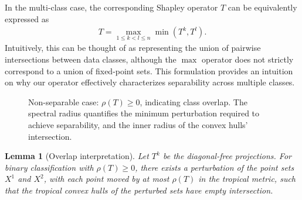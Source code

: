 \documentclass{article}
\newtheorem{lemma}[theorem]{Lemma}
\renewcommand{\geq}{\geqslant}
\renewcommand{\leq}{\leqslant}
\begin{document}
In the multi-class case, the corresponding Shapley operator $T$ can be equivalently expressed as
\begin{align}
T = \max_{1 \leq k < l \leq n}\min(T^k, T^l).
\end{align}
Intuitively, this can be thought of as representing the union of pairwise intersections between data classes, although the $\max$ operator does not strictly correspond to a union of fixed-point sets. This formulation provides an intuition on why our operator effectively characterizes separability across multiple classes.

\begin{figure}[htbp]
    \centering
    \resizebox{0.5\textwidth}{!}{\clipbox{0.15\width{} 0.15\height{} 0.15\width{} 0.15\height{}}{}}
    \caption{Non-separable case: $\rho(T) \geq 0$, indicating class overlap. The spectral radius quantifies the minimum perturbation required to achieve separability, and the inner radius of the convex hulls' intersection.}
    \label{fig:non_separable}
\end{figure}


\begin{lemma}[Overlap interpretation]\label{lemma:perturbation}
Let $T^k$ be the diagonal-free projections. For binary classification with $\rho(T) \geq 0$, there exists a perturbation of the point sets $X^1$ and $X^2$, with each point moved by at most $\rho(T)$ in the tropical metric, such that the tropical convex hulls of the perturbed sets have empty intersection.
\end{lemma}
\end{document}
